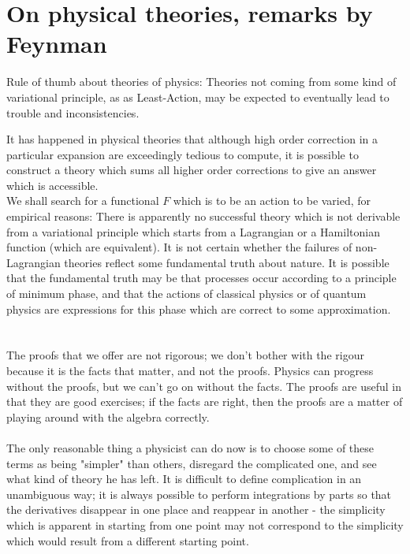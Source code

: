 \section{On physical theories, remarks by Feynman}
\begin{statements}
	Rule of thumb about theories of physics: Theories not coming from some kind of variational principle, as as Least-Action, may be expected to eventually lead to trouble and inconsistencies.
\end{statements}
 It has happened in physical theories that although high order correction in a particular expansion are exceedingly tedious to compute, it is possible to construct a theory which sums all higher order corrections to give an answer which is accessible. \\
We shall search for a functional $F$ which is to be an action to be varied, for empirical reasons: There is apparently no successful theory which is not derivable from a variational principle which starts from a Lagrangian or a Hamiltonian function (which are equivalent). It is not certain whether the failures of non-Lagrangian theories reflect some fundamental truth about nature. It is possible that the fundamental truth may be that processes occur according to a principle of minimum phase, and that the actions of classical physics or of quantum physics are expressions for this phase which are correct to some approximation.\\
\\
\\
The proofs that we offer are not rigorous; we don't bother with the rigour because it is the facts that matter, and not the proofs. Physics can progress without the proofs, but we can't go on without the facts. The proofs are useful in that they are good exercises; if the facts are right, then the proofs are a matter of playing around with the algebra correctly.
\\
\\
The only reasonable thing a physicist can do now is to choose some of these terms as being "simpler" than others, disregard the complicated one, and see what kind of theory he has left. It is difficult to define complication in an unambiguous way; it is always possible to perform integrations by parts so that the derivatives disappear in one place and reappear in another - the simplicity which is apparent in starting from one point may not correspond to the simplicity which would result from a different starting point.


